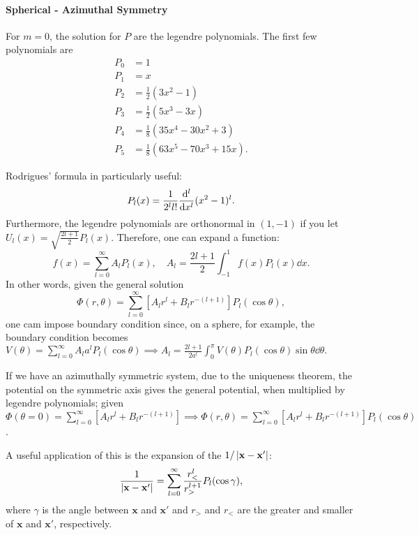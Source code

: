 \documentclass{article}
\begin{document}
\paragraph{Spherical - Azimuthal Symmetry}
For $m=0$, the solution for $P$ are the legendre polynomials. The first few polynomials are 
\begin{align*}
    P_0&=1\\
    P_1&=x\\
    P_2&=\frac 12(3x^2-1)\\
    P_3&=\frac 12(5x^3-3x)\\
    P_4&=\frac 18(35x^4-30x^2+3)\\
    P_5&=\frac 18(63x^5-70x^3+15x).
\end{align*}

Rodrigues' formula in particularly useful:
$$P_l(x)=\frac 1{2^ll!}\frac{\mathrm{d}^{l}}{\mathrm{d}{x}^{l}}(x^2-1)^l.$$
Furthermore, the legendre polynomials are orthonormal in $(1,-1)$ if you let $U_l(x)=\sqrt{\frac{2l+1}2}P_l(x).$ Therefore, one can expand a function:
$$f(x)=\sum^\infty_{l=0}A_lP_l(x),\quad A_l=\frac{2l+1}2\int^1_{-1}f(x)P_l(x)\dd x.$$
In other words, given the general solution 
$$\Phi(r,\theta)=\sum^\infty_{l=0}[A_lr^l+B_lr^{-(l+1)}]P_l(\cos\theta),$$
one cam impose boundary condition since, on a sphere, for example, the boundary condition becomes $V(\theta)=\sum^\infty_{l=0}A_la^lP_l(\cos\theta)\implies A_l=\frac{2l+1}{2a^l}\int^\pi_0V(\theta)P_l(\cos\theta)\sin\theta\dd\theta.$

If we have an azimuthally symmetric system, due to the uniqueness theorem, the potential on the symmetric axis gives the general potential, when multiplied by legendre polynomials; given $\Phi(\theta=0)=\sum^\infty_{l=0}[A_lr^l+B_lr^{-(l+1)}]\implies\Phi(r,\theta)=\sum^\infty_{l=0}[A_lr^l+B_lr^{-(l+1)}]P_l(\cos\theta)$. 

A useful application of this is the expansion of the $1/\left\lvert\mathbf x-\mathbf x'\right\rvert$:
$$\frac 1{\left\lvert\mathbf x-\mathbf x'\right\rvert}=\sum^\infty_{l=0}\frac{r^l_<}{r^{l+1}_>}P_l(\cos\gamma),$$
where $\gamma$ is the angle between $\mathbf x$ and $\mathbf x'$ and $r_>$ and $r_<$ are the greater and smaller of $\mathbf x$ and $\mathbf x'$, respectively. 
\end{document}
